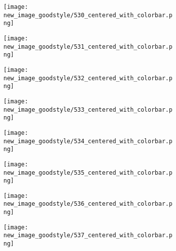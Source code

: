 \documentclass[a4paper,12pt]{article}
\begin{document}
\begin{figure}[H]
  \begin{subfigure}{0.11\textwidth}
    \texttt{[image: new\_image\_goodstyle/530\_centered\_with\_colorbar.png]}
  \end{subfigure}
  \hfill
  \begin{subfigure}{0.11\textwidth}
    \texttt{[image: new\_image\_goodstyle/531\_centered\_with\_colorbar.png]}
  \end{subfigure}
  \hfill
  \begin{subfigure}{0.11\textwidth}
    \texttt{[image: new\_image\_goodstyle/532\_centered\_with\_colorbar.png]}
  \end{subfigure}
  \hfill
  \begin{subfigure}{0.11\textwidth}
    \texttt{[image: new\_image\_goodstyle/533\_centered\_with\_colorbar.png]}
  \end{subfigure}
  \hfill
  \begin{subfigure}{0.11\textwidth}
    \texttt{[image: new\_image\_goodstyle/534\_centered\_with\_colorbar.png]}
  \end{subfigure}
  \hfill
  \begin{subfigure}{0.11\textwidth}
    \texttt{[image: new\_image\_goodstyle/535\_centered\_with\_colorbar.png]}
  \end{subfigure}
  \hfill
  \begin{subfigure}{0.11\textwidth}
    \texttt{[image: new\_image\_goodstyle/536\_centered\_with\_colorbar.png]}
  \end{subfigure}
  \hfill
  \begin{subfigure}{0.11\textwidth}
    \texttt{[image: new\_image\_goodstyle/537\_centered\_with\_colorbar.png]}
  \end{subfigure}
  \hfill
\end{figure}
\end{document}
